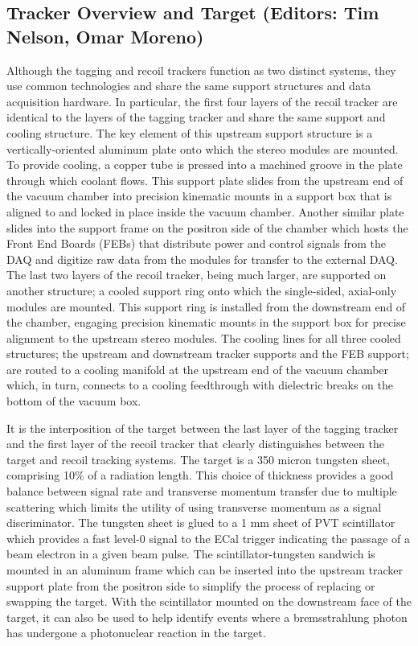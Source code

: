 \subsection{Tracker Overview and Target (Editors: Tim Nelson, Omar Moreno)}

Although the tagging and recoil trackers function as two distinct systems, they use common technologies and share the same support structures and data acquisition hardware.  In particular, the first four layers of the recoil tracker are identical to the layers of the tagging tracker and share the same support and cooling structure.  The key element of this upstream support structure is a vertically-oriented aluminum plate onto which the stereo modules are mounted.  To provide cooling, a copper tube is pressed into a machined groove in the plate through which coolant flows.  This support plate slides from the upstream end of the vacuum chamber into precision kinematic mounts in a support box that is aligned to and locked in place inside the vacuum chamber.  Another similar plate slides into the support frame on the positron side of the chamber which hosts the Front End Boards (FEBs) that distribute power and control signals from the DAQ and digitize raw data from the modules for transfer to the external DAQ.  The last two layers of the recoil tracker, being much larger, are supported on another structure; a cooled support ring onto which the single-sided, axial-only modules are mounted. This support ring is installed from the downstream end of the chamber, engaging precision kinematic mounts in the support box for precise alignment to the upstream stereo modules. The cooling lines for all three cooled structures; the upstream and downstream tracker supports and the FEB support; are routed to a cooling manifold at the upstream end of the vacuum chamber which, in turn, connects to a cooling feedthrough with dielectric breaks on the bottom of the vacuum box.

It is the interposition of the target between the last layer of the tagging tracker and the first layer of the recoil tracker that clearly distinguishes between the target and recoil tracking systems. The target is a 350 micron tungsten sheet, comprising 10\% of a radiation length. This choice of thickness provides a good balance between signal rate and transverse momentum transfer due to multiple scattering which limits the utility of using transverse momentum as a signal discriminator. The tungsten sheet is glued to a 1 mm sheet of PVT scintillator which provides a fast level-0 signal to the ECal trigger indicating the passage of a beam electron in a given beam pulse.  The scintillator-tungsten sandwich is mounted in an aluminum frame which can be inserted into the upstream tracker support plate from the positron side to simplify the process of replacing or swapping the target.  With the scintillator mounted on the downstream face of the target, it can also be used to help identify events where a bremsstrahlung photon has undergone a photonuclear reaction in the target.

